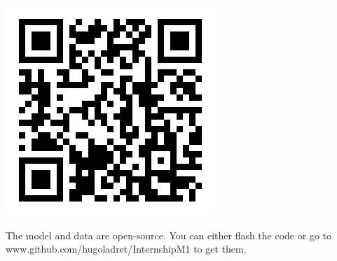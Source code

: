 \documentclass[a0,portrait]{a0poster}
\begin{document}
\begin{multicols}{3}
\begin{minipage}{0.3\linewidth}
\includegraphics[width=1.\linewidth]{GitQR.png}
\end{minipage}\hfil
\begin{minipage}{0.67\linewidth}
The model and data are open-source. You can either flash the code or go to www.github.com/hugoladret/InternshipM1 to get them.
\end{minipage}

\end{multicols}
\end{document}
